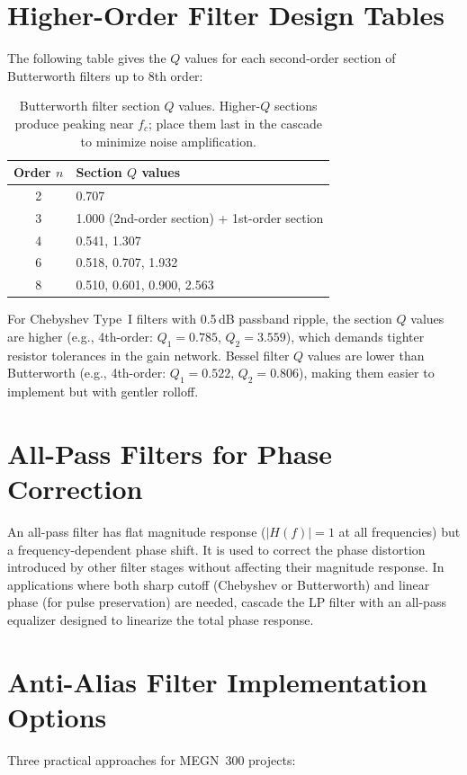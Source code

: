 \documentclass[11pt,letterpaper,twoside,openany]{book}
\begin{document}
\section{Higher-Order Filter Design Tables}
The following table gives the $Q$ values for each second-order section of Butterworth filters up to 8th order:

\begin{table}[htbp]\centering\small
\begin{tabular}{c l}
\toprule
\textbf{Order $n$} & \textbf{Section $Q$ values} \\
\midrule
2 & 0.707 \\
3 & 1.000 (2nd-order section) + 1st-order section \\
4 & 0.541, 1.307 \\
6 & 0.518, 0.707, 1.932 \\
8 & 0.510, 0.601, 0.900, 2.563 \\
\bottomrule
\end{tabular}
\caption{Butterworth filter section $Q$ values. Higher-$Q$ sections produce peaking near $f_c$; place them last in the cascade to minimize noise amplification.}
\end{table}

For Chebyshev Type~I filters with 0.5\,dB passband ripple, the section $Q$ values are higher (e.g., 4th-order: $Q_1 = 0.785$, $Q_2 = 3.559$), which demands tighter resistor tolerances in the gain network. Bessel filter $Q$ values are lower than Butterworth (e.g., 4th-order: $Q_1 = 0.522$, $Q_2 = 0.806$), making them easier to implement but with gentler rolloff.

\section{All-Pass Filters for Phase Correction}
An all-pass filter has flat magnitude response ($|H(f)| = 1$ at all frequencies) but a frequency-dependent phase shift. It is used to correct the phase distortion introduced by other filter stages without affecting their magnitude response. In applications where both sharp cutoff (Chebyshev or Butterworth) and linear phase (for pulse preservation) are needed, cascade the LP filter with an all-pass equalizer designed to linearize the total phase response.

\section{Anti-Alias Filter Implementation Options}
Three practical approaches for MEGN~300 projects:
\end{document}
